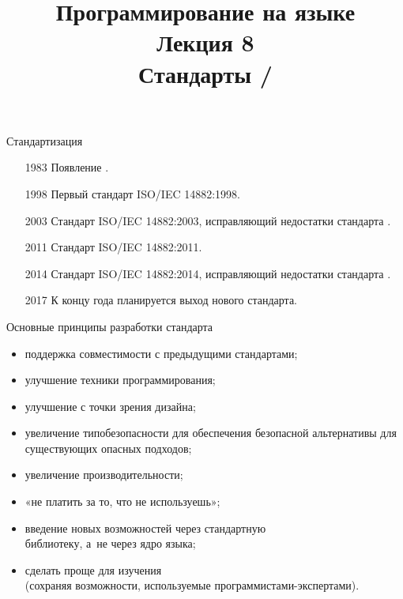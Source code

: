 \documentclass[aspectration=1610,t]{beamer}
\title{{\bf Программирование на языке \langcpp\protect\\Лекция
8\protect\vspace{1em}\\}Стандарты \langcpp[11]/\langcpp[14]}
\begin{document}
\begin{frame} 
  \titlepage
\end{frame}

\begin{frame}[fragile]{Стандартизация \langcpp}
    \begin{itemize}
        \pause\item[1983] Появление \langcpp.
        \pause\item[1998] Первый стандарт ISO/IEC 14882:1998.
        \pause\item[2003] Стандарт ISO/IEC 14882:2003, исправляющий недостатки стандарта \langcpp[98].
        \pause\item[2011] Стандарт ISO/IEC 14882:2011.
        \pause\item[2014] Стандарт ISO/IEC 14882:2014, исправляющий недостатки стандарта \langcpp[11].
        \pause\item[2017] К концу года планируется выход нового стандарта.
    \end{itemize}
\end{frame}

\begin{frame}[fragile]{Основные принципы разработки стандарта}
    \begin{itemize}
        \pause\item поддержка совместимости с предыдущими стандартами;
        \pause\item улучшение техники программирования;
        \pause\item улучшение \langcpp с точки зрения дизайна; 
        \pause\item увеличение типобезопасности для обеспечения безопасной альтернативы для существующих опасных подходов;
        \pause\item увеличение производительности;
        \pause\item «не платить за то, что не используешь»;
        \pause\item введение новых возможностей через стандартную\\ библиотеку, а~не через ядро языка;                
        \pause\item сделать \langcpp проще для изучения\\
        (сохраняя возможности, используемые программистами-экспертами).
    \end{itemize}
\end{frame}
\end{document}

